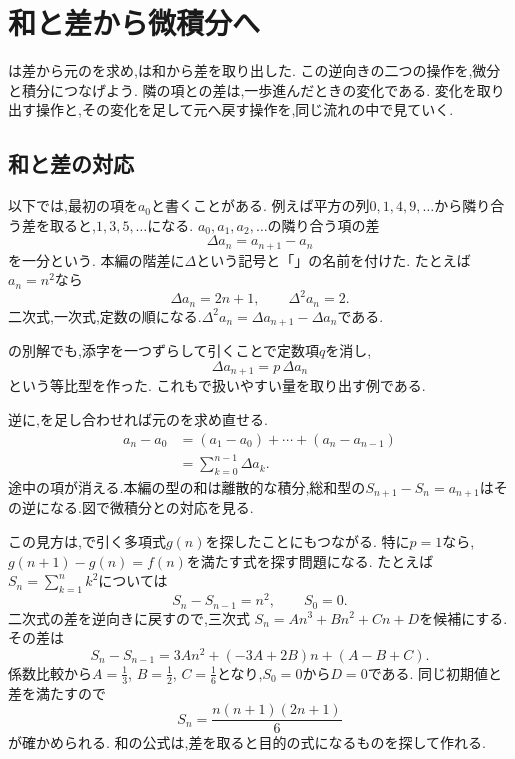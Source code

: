 
\section{和と差から微積分へ}\label{節：和と差から微積分へ}

は差から元のを求め,は和から差を取り出した.
この逆向きの二つの操作を,微分と積分につなげよう.
隣の項との差は,一歩進んだときの変化である.
変化を取り出す操作と,その変化を足して元へ戻す操作を,同じ流れの中で見ていく.

\subsection{和と差の対応}
以下では,最初の項を$a_0$と書くことがある.
例えば平方の列$0,1,4,9,\ldots$から隣り合う差を取ると,$1,3,5,\ldots$になる.
$a_0,a_1,a_2,\ldots$の隣り合う項の差
\[
  \Delta a_n=a_{n+1}-a_n
\]
を一分という.
本編の階差に$\Delta$という記号と「」の名前を付けた.
たとえば$a_n=n^2$なら
\[
  \Delta a_n=2n+1,\qquad \Delta^2a_n=2.
\]
二次式,一次式,定数の順になる.$\Delta^2a_n=\Delta a_{n+1}-\Delta a_n$である.

の別解でも,添字を一つずらして引くことで定数項$q$を消し,
\[
  \Delta a_{n+1}=p\,\Delta a_n
\]
という等比型を作った.
これもで扱いやすい量を取り出す例である.

逆に,を足し合わせれば元のを求め直せる.
\[
  \begin{aligned}
    a_n-a_0
    &=(a_1-a_0)+\cdots+(a_n-a_{n-1})\\
    &=\sum_{k=0}^{n-1}\Delta a_k.
  \end{aligned}
\]
途中の項が消える.本編の型の和は離散的な積分,総和型の$S_{n+1}-S_n=a_{n+1}$はその逆になる.図で微積分との対応を見る.
\BookFigDifference

この見方は,で引く多項式$g(n)$を探したことにもつながる.
特に$p=1$なら,$g(n+1)-g(n)=f(n)$を満たす式を探す問題になる.
たとえば$S_n=\sum_{k=1}^n k^2$については
\[
  S_n-S_{n-1}=n^2,\qquad S_0=0.
\]
二次式の差を逆向きに戻すので,三次式
$S_n=An^3+Bn^2+Cn+D$を候補にする.
その差は
\[
  S_n-S_{n-1}
  =3An^2+(-3A+2B)n+(A-B+C).
\]
係数比較から$\displaystyle A=\frac{1}{3}$, $\displaystyle B=\frac{1}{2}$, $\displaystyle C=\frac{1}{6}$となり,$S_0=0$から$D=0$である.
同じ初期値と差を満たすので
\[
  S_n=\frac{n(n+1)(2n+1)}6
\]
が確かめられる.
和の公式は,差を取ると目的の式になるものを探して作れる.

